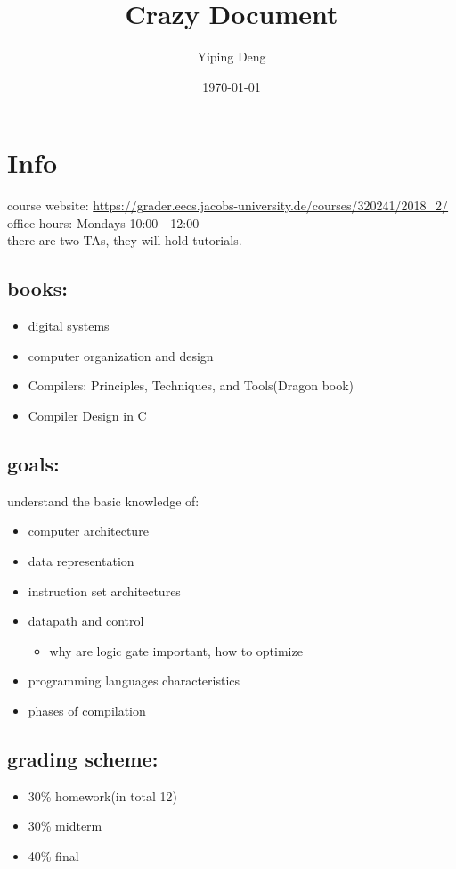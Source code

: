 \documentclass[11pt]{article}
\title{Crazy Document}
\author{Yiping Deng}
\date{\today}
\title{}
\begin{document}
\tableofcontents
\maketitle
\section{Info}
\label{sec:org800c109}
course website: \url{https://grader.eecs.jacobs-university.de/courses/320241/2018\_2/} \\
office hours: Mondays 10:00 - 12:00 \\
there are two TAs, they will hold tutorials. \\
\subsection{books:}
\label{sec:org460b20a}
\begin{itemize}
\item digital systems
\item computer organization and design
\item Compilers: Principles, Techniques, and Tools(Dragon book)
\item Compiler Design in C
\end{itemize}
\subsection{goals:}
\label{sec:org09cee48}
understand the basic knowledge of:
\begin{itemize}
\item computer architecture
\item data representation
\item instruction set architectures
\item datapath and control
\begin{itemize}
\item why are logic gate important, how to optimize
\end{itemize}
\item programming languages characteristics
\item phases of compilation
\end{itemize}
\subsection{grading scheme:}
\label{sec:orgbd94059}
\begin{itemize}
\item 30\% homework(in total 12)
\item 30\% midterm
\item 40\% final
\end{itemize}
\end{document}
